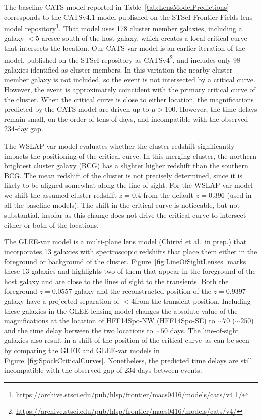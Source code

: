 The baseline CATS model reported in
Table~\ref{tab:LensModelPredictions} corresponds to the CATSv4.1 model
published on the STScI Frontier Fields lens model
repository\footnote{\url{https://archive.stsci.edu/pub/hlsp/frontier/macs0416/models/cats/v4.1/}}.
That model uses 178 cluster member galaxies, including a galaxy $<$5
arcsec south of the \spock host galaxy, which creates a local critical
curve that intersects the \spocktwo location.  Our CATS-var model is
an earlier iteration of the model, published on the STScI repository
as
CATSv4\footnote{\url{https://archive.stsci.edu/pub/hlsp/frontier/macs0416/models/cats/v4/}},
and includes only 98 galaxies identified as cluster members.  In this
variation the nearby cluster member galaxy is not included, so the
\spocktwo event is not intersected by a critical curve. However, the
\spockone event is approximately coincident with the primary
critical curve of the  cluster.  When the critical curve is
close to either \spock location, the magnifications predicted by the
CATS model are driven up to $\mu>100$.  However, the time delays
remain small, on the order of tens of days, and incompatible with the
observed 234-day gap.

The WSLAP-var model evaluates whether the cluster redshift
significantly impacts the positioning of the critical curve. In this
merging cluster, the northern brightest cluster galaxy (BCG) has a
slighter higher redshift than the southern BCG. The mean redshift of
the cluster is not precisely determined, since it is likely to be
aligned somewhat along the line of sight.  For the WSLAP-var model we
shift the assumed cluster redshift $z=0.4$ from the default $z=0.396$
(used in all the baseline models).  The shift in the critical curve is
noticeable, but not substantial, insofar as this change does not drive
the critical curve to intersect either or both of the \spock
locations.

The GLEE-var model is a multi-plane lens model (Chiriv{\`i} et al.~in
prep.) that incorporates 13 galaxies with spectroscopic redshifts that
place them either in the foreground or background of the 
cluster.  Figure~\ref{fig:LineOfSightLenses} marks these 13 galaxies
and highlights two of them that appear in the foreground of the \spock
host galaxy and are close to the lines of sight to the \spock
transients. Both the foreground $z=0.0557$ galaxy and the
reconstructed position of the $z=0.9397$ galaxy have a projected
separation of $<$4\arcsec from the \spocktwo transient position.
Including these galaxies in the GLEE lensing model changes the
absolute value of the magnifications at the location of HFF14Spo-NW
(HFF14Spo-SE) to $\sim70$ ($\sim250$) and the time delay between the
two locations to $\sim50$ days.  The line-of-sight galaxies also
result in a shift of the position of the critical curve--as can be
seen by comparing the GLEE and GLEE-var models in
Figure~\ref{fig:SpockCriticalCurves}. Nonetheless, the predicted time
delays are still incompatible with the observed gap of 234 days
between events.

